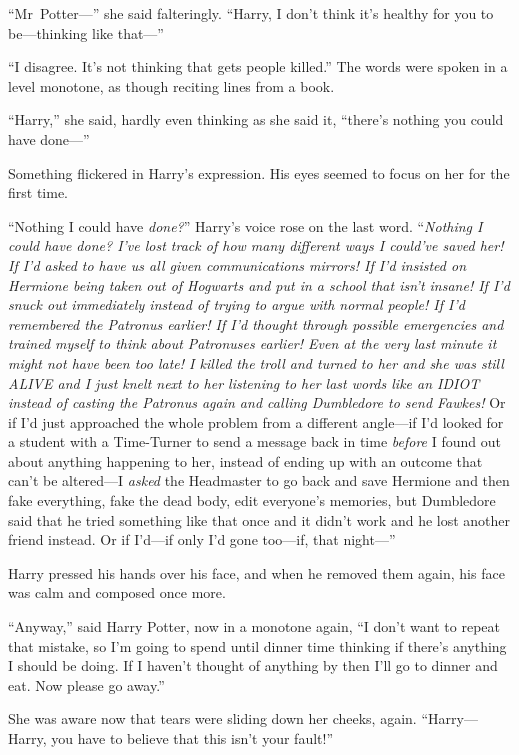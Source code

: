 “Mr~Potter—” she said falteringly. “Harry, I don’t think it’s healthy for you to be—thinking like that—”

“I disagree. It’s not thinking that gets people killed.” The words were spoken in a level monotone, as though reciting lines from a book.

“Harry,” she said, hardly even thinking as she said it, “there’s nothing you could have done—”

Something flickered in Harry’s expression. His eyes seemed to focus on her for the first time.

“Nothing I could have \emph{done?}” Harry’s voice rose on the last word. “\emph{Nothing I could have \emph{done?} I’ve lost track of how many different ways I could’ve saved her! If I’d asked to have us all given communications mirrors! If I’d insisted on Hermione being taken out of Hogwarts and put in a school that isn’t insane! If I’d snuck out immediately instead of trying to argue with normal people! If I’d remembered the Patronus earlier! If I’d thought through possible emergencies and trained myself to think about Patronuses earlier! Even at the very last minute it might not have been too late! I killed the troll and turned to her and she was still ALIVE and I just knelt next to her listening to her last words like an IDIOT instead of casting the Patronus again and calling Dumbledore to send Fawkes!} Or if I’d just approached the whole problem from a different angle—if I’d looked for a student with a Time-Turner to send a message back in time \emph{before} I found out about anything happening to her, instead of ending up with an outcome that can’t be altered—I \emph{asked} the Headmaster to go back and save Hermione and then fake everything, fake the dead body, edit everyone’s memories, but Dumbledore said that he tried something like that once and it didn’t work and he lost another friend instead. Or if I’d—if only I’d gone too—if, that night—”

Harry pressed his hands over his face, and when he removed them again, his face was calm and composed once more.

“Anyway,” said Harry Potter, now in a monotone again, “I don’t want to repeat that mistake, so I’m going to spend until dinner time thinking if there’s anything I should be doing. If I haven’t thought of anything by then I’ll go to dinner and eat. Now please go away.”

She was aware now that tears were sliding down her cheeks, again. “Harry—Harry, you have to believe that this isn’t your fault!”


